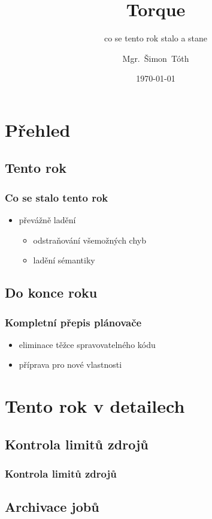 \documentclass[pdftex,aspectratio=169]{beamer}
\title{Torque}
\subtitle{co se tento rok stalo a stane}
\author[]{Mgr.~Šimon~Tóth}
\date{\today}
\begin{document}
\begin{frame}
	\titlepage
\end{frame}

\section{Přehled}
\subsection{Tento rok}

\begin{frame}
	\frametitle{Co se stalo tento rok}
	\begin{itemize}
		\item{převážně ladění}
		\begin{itemize}
			\item{odstraňování všemožných chyb}
			\item{ladění sémantiky}
		\end{itemize}
	\end{itemize}
\end{frame}

\subsection{Do konce roku}

\begin{frame}
	\frametitle{Kompletní přepis plánovače}
	\begin{itemize}
		\item{eliminace těžce spravovatelného kódu}
		\item{příprava pro nové vlastnosti}
	\end{itemize}
\end{frame}

\section{Tento rok v detailech}
\subsection{Kontrola limitů zdrojů}

\begin{frame}
	\frametitle{Kontrola limitů zdrojů}
\end{frame}

\subsection{Archivace jobů}
\end{document}
